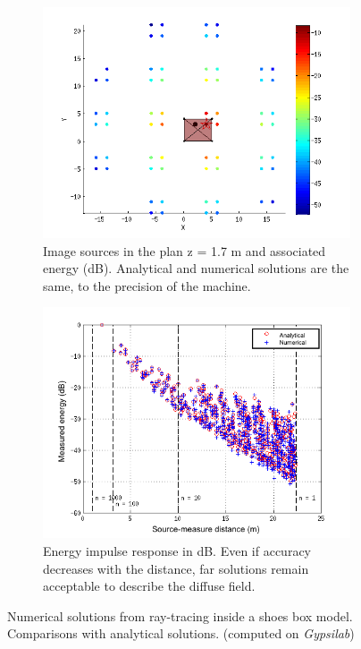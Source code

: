 \documentclass[AMA,STIX1COL]{WileyNJD-v2}
\begin{document}
\begin{figure}[t]
\centering
	\begin{subfigure}{0.49\textwidth}
		\includegraphics[width=\linewidth]{sourcesImages}
		\caption{Image sources in the plan z = 1.7 m and associated energy (dB). Analytical and numerical solutions are the same, to the precision of the machine.}
		\label{sourcesImages}
	\end{subfigure}
	\begin{subfigure}{0.49\textwidth}
		\includegraphics[width=\linewidth]{boite}
		\caption{Energy impulse response in dB. Even if accuracy decreases with the distance, far solutions remain acceptable to describe the diffuse field. }
		\label{boite}
	\end{subfigure}
	\caption{Numerical solutions from ray-tracing inside a shoes box model. Comparisons with analytical solutions. (computed on \textit{Gypsilab})}
\end{figure}
\end{document}
